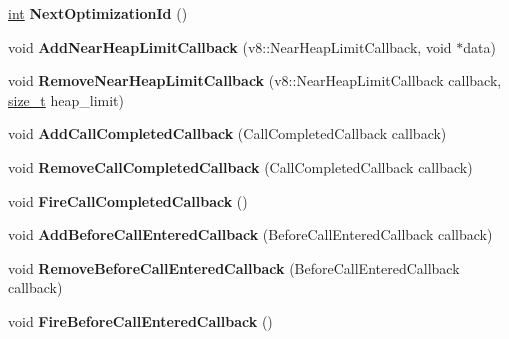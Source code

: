 \begin{DoxyCompactItemize}
\mbox{\hyperlink{classint}{int}} {\bfseries Next\+Optimization\+Id} ()
\item 
\mbox{\label{classv8_1_1internal_1_1Isolate_a3ffc4db149880d2adfd1d7910f59d525}} 
void {\bfseries Add\+Near\+Heap\+Limit\+Callback} (v8\+::\+Near\+Heap\+Limit\+Callback, void $\ast$data)
\item 
\mbox{\label{classv8_1_1internal_1_1Isolate_a31c9ce462a9625528851fa86f4ea4661}} 
void {\bfseries Remove\+Near\+Heap\+Limit\+Callback} (v8\+::\+Near\+Heap\+Limit\+Callback callback, \mbox{\hyperlink{classsize__t}{size\+\_\+t}} heap\+\_\+limit)
\item 
\mbox{\label{classv8_1_1internal_1_1Isolate_ab1e71528cbb0b79d44eb2dbc0a03c38b}} 
void {\bfseries Add\+Call\+Completed\+Callback} (Call\+Completed\+Callback callback)
\item 
\mbox{\label{classv8_1_1internal_1_1Isolate_a556b9cd41f26acd9577405a459d794c0}} 
void {\bfseries Remove\+Call\+Completed\+Callback} (Call\+Completed\+Callback callback)
\item 
\mbox{\label{classv8_1_1internal_1_1Isolate_a967a40b2fbb51dc3a14529f7a501c9bc}} 
void {\bfseries Fire\+Call\+Completed\+Callback} ()
\item 
\mbox{\label{classv8_1_1internal_1_1Isolate_a7f21dd859aac43aead8637649942e2fd}} 
void {\bfseries Add\+Before\+Call\+Entered\+Callback} (Before\+Call\+Entered\+Callback callback)
\item 
\mbox{\label{classv8_1_1internal_1_1Isolate_abca2a202db6ee0491435b7d4dc936b8a}} 
void {\bfseries Remove\+Before\+Call\+Entered\+Callback} (Before\+Call\+Entered\+Callback callback)
\item 
\mbox{\label{classv8_1_1internal_1_1Isolate_a117db1173c639b720077581078188152}} 
void {\bfseries Fire\+Before\+Call\+Entered\+Callback} ()
\item 
\mbox{\label{classv8_1_1internal_1_1Isolate_a066e5b7f6dca46db4fad09cf59a23765}} 

\end{DoxyCompactItemize}
